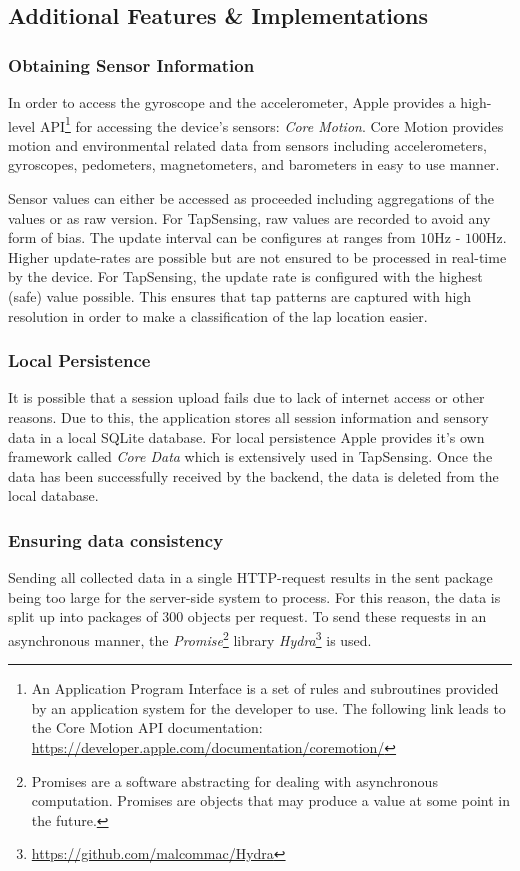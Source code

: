 \subsection{Additional Features \& Implementations}
\subsubsection{Obtaining Sensor Information}
In order to access the gyroscope and the accelerometer, Apple provides a high-level API\footnote{An Application Program Interface is a set of rules and subroutines provided by an application system for the developer to use. The following link leads to the Core Motion API documentation: \url{https://developer.apple.com/documentation/coremotion/} } for accessing the device's sensors: \textit{Core Motion}. Core Motion provides motion and environmental related data from sensors including accelerometers, gyroscopes, pedometers, magnetometers, and barometers in easy to use manner.

Sensor values can either be accessed as proceeded including aggregations of the values or as raw version. For TapSensing, raw values are recorded to avoid any form of bias. The update interval can be configures at ranges from $10$Hz - $100$Hz. Higher update-rates are possible but are not ensured to be processed in real-time by the device. For TapSensing, the update rate is configured with the highest (safe) value possible. This ensures that tap patterns are captured with high resolution in order to make a classification of the lap location easier.
\subsubsection{Local Persistence}
It is possible that a session upload fails due to lack of internet access or other reasons. Due to this, the application stores all session information and sensory data in a local SQLite database. For local persistence Apple provides it's own framework called \textit{Core Data} which is extensively used in TapSensing. Once the data has been successfully received by the backend, the data is deleted from the local database.
\subsubsection{Ensuring data consistency}
Sending all collected data in a single HTTP-request results in the sent package being too large for the server-side system to process. For this reason, the data is split up into packages of 300 objects per request. To send these requests in an asynchronous manner, the \textit{Promise}\footnote{Promises are a software abstracting for dealing with asynchronous computation. Promises are objects that may produce a value at some point in the future.}\cite{Liskov:1988:PLS:53990.54016} library \textit{Hydra}\footnote{\url{https://github.com/malcommac/Hydra}} is used.

